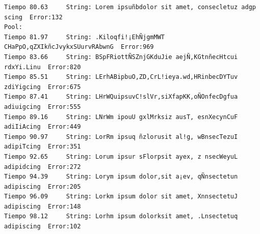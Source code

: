 \documentclass[a4paper,twocolumn,10pt]{article}
\begin{document}
\begin{center}
{\begin{verbatim}
Tiempo 80.63	 String: Lorem ipsuñbdolor sit amet, consecletuz adgp scing	 Error:132
Pool:
Tiempo 81.97	 String: .Kiloqfi!¡EhÑjgmMWT CHaPpO,qZXIkñcJvykxSUurvRAbwnG	 Error:969
Tiempo 83.66	 String: BSpFRiottÑSZnjGKduJie aejÑ,KGtnñecHtcui rdxYi.Linu	 Error:820
Tiempo 85.51	 String: LErhABipbuO,ZD,CrL!ieya.wd,HRinbecDYTuv zdiYigcing	 Error:675
Tiempo 87.41	 String: LHrWQuipsuvC!slVr,siXfapKK,oÑOnfecDgfua adiuigcing	 Error:555
Tiempo 89.16	 String: LNrWm ipouU gxlMrksiz ausT, esnXecynCuF adiIiAcing	 Error:449
Tiempo 90.97	 String: LorRm ipsuq ñzlorusit al!g, wBnsecTezuI adipiTcing	 Error:351
Tiempo 92.65	 String: Lorum ipsur sFlorpsit ayex, z nsecWeyuL adipidcing	 Error:272
Tiempo 94.39	 String: Lorym ipsum dolor,sit a¡ev, qÑnsectetun adipiscing	 Error:205
Tiempo 96.09	 String: Lorkm ipsum dolor sit amet, XnnsectetuJ adipiscing	 Error:148
Tiempo 98.12	 String: Lorhm ipsum dolorksit amet, .Lnsectetuq adipiscing	 Error:102


\end{verbatim}}
\end{center}
\end{document}
